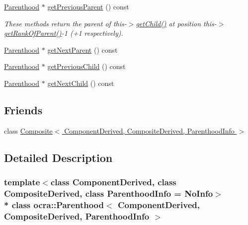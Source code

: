 {\bf }\par
\begin{DoxyCompactItemize}
\item 
\hyperlink{classocra_1_1Parenthood}{Parenthood} $\ast$ \hyperlink{classocra_1_1Parenthood_a1e7571ebc32c97ba1308821a3b656380}{get\+Previous\+Parent} () const 
\begin{DoxyCompactList}\small\item\em These methods return the parent of this-\/$>$\hyperlink{classocra_1_1Parenthood_ae574a4ecbcc5b7adcdff9692329579c3}{get\+Child()} at position this-\/$>$\hyperlink{classocra_1_1Parenthood_a153c882cff8f67fb99c6877c5a6f1900}{get\+Rank\+Of\+Parent()}-\/1 (+1 respectively). \end{DoxyCompactList}\item 
\hyperlink{classocra_1_1Parenthood}{Parenthood} $\ast$ \hyperlink{classocra_1_1Parenthood_a1564280f442d5a48f400f9f18b875e1f}{get\+Next\+Parent} () const 
\end{DoxyCompactItemize}

{\bf }\par
\begin{DoxyCompactItemize}
\item 
\hyperlink{classocra_1_1Parenthood}{Parenthood} $\ast$ \hyperlink{classocra_1_1Parenthood_a355204a53e4f713a937fd1f9b9b93a5e}{get\+Previous\+Child} () const 
\item 
\hyperlink{classocra_1_1Parenthood}{Parenthood} $\ast$ \hyperlink{classocra_1_1Parenthood_a8ca8d95298160a0c39d0d69be3e5142b}{get\+Next\+Child} () const 
\end{DoxyCompactItemize}

\subsection*{Friends}
\begin{DoxyCompactItemize}
\item 
class \hyperlink{classocra_1_1Parenthood_a157fe78169803ffbbb7290a687e96f5e}{Composite$<$ Component\+Derived, Composite\+Derived, Parenthood\+Info $>$}
\end{DoxyCompactItemize}


\subsection{Detailed Description}
\subsubsection*{template$<$class Component\+Derived, class Composite\+Derived, class Parenthood\+Info = No\+Info$>$\\*
class ocra\+::\+Parenthood$<$ Component\+Derived, Composite\+Derived, Parenthood\+Info $>$}

